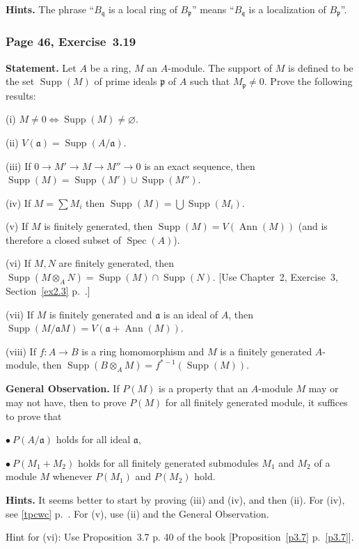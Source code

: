 \documentclass[12pt,letterpaper]{article}%
\newcommand{\oo}{\operatorname}\newcommand{\ooo}{\operatorname*}
\newcommand{\mf}{\mathfrak}
\newcommand{\aaa}{\mf a}
\newcommand{\ppp}{\mf p}
\newcommand{\qqq}{\mf q}
\newcommand{\Ann}{\oo{Ann}}
\newcommand{\bu}{\bullet}
\newcommand{\Spec}{\operatorname{Spec}}\newcommand{\Sp}{\operatorname{Spec}}
\newcommand{\nn}{\noindent}
\begin{document}
\nn\textbf{Hints.} The phrase ``$B_\qqq$ is a local ring of $B_\ppp$'' means ``$B_\qqq$ is a localization of $B_\ppp$''.

\subsubsection{Page 46, Exercise~3.19}\label{ex3.19}%

\textbf{Statement.} Let $A$ be a ring, $M$ an $A$-module. The support of $M$ is defined to be the set $\oo{Supp}(M)$ of prime ideals $\ppp$ of $A$ such that $M_\ppp\ne0$. Prove the following results:

\nn(i) $M\ne0\iff\oo{Supp}(M)\ne\varnothing$.

\nn(ii) $V(\aaa)=\oo{Supp}(A/\aaa)$.

\nn(iii) If $0\to M'\to M\to M''\to0$ is an exact sequence, then $\oo{Supp}(M) =\oo{Supp}(M')\cup\oo{Supp}(M'')$.

\nn(iv) If $M=\sum M_i$ then $\oo{Supp}(M)=\bigcup\oo{Supp}(M_i)$.

\nn(v) If $M$ is finitely generated, then $\oo{Supp}(M)=V(\Ann(M))$ (and is therefore
a closed subset of $\Spec(A)$).

\nn(vi) If $M,N$ are finitely generated, then $\oo{Supp}(M\otimes_AN)=\oo{Supp}(M)\cap\oo{Supp}(N)$. [Use Chapter~2, Exercise~3, Section~\ref{ex2.3} p.~\pageref{ex2.3}.]

\nn(vii) If $M$ is finitely generated and $\aaa$ is an ideal of $A$, then $\oo{Supp}(M/\aaa M)=V(\aaa+\Ann(M))$.

\nn(viii) If $f:A\to B$ is a ring homomorphism and $M$ is a finitely generated $A$-module, then $\oo{Supp}(B\otimes_AM)=f^{*-1}(\oo{Supp}(M))$.

\nn\textbf{General Observation.} If $P(M)$ is a property that an $A$-module $M$ may or may not have, then to prove $P(M)$ for all finitely generated module, it suffices to prove that 

\nn$\bu\ P(A/\aaa)$ holds for all ideal $\aaa$,

\nn$\bu\ P(M_1+M_2)$ holds for all finitely generated submodules $M_1$ and $M_2$ of a module $M$ whenever $P(M_1)$ and $P(M_2)$ hold.

\nn\textbf{Hints.} It seems better to start by proving (iii) and (iv), and then (ii). For (iv), see \eqref{tpcwc} p.~\pageref{tpcwc}. For (v), use (ii) and the General Observation. 

\nn Hint for (vi): Use Proposition~3.7 p. 40 of the book [Proposition~\ref{p3.7} p.~\ref{p3.7}].
\end{document}
